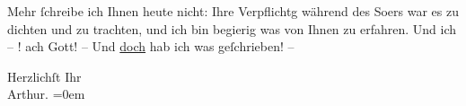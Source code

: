 \pstart
           Mehr{ }ſchreibe ich Ihnen heute nicht: Ihre Verpflichtg während des So{\geminationm}ers war es zu dichten und zu trachten, und ich bin
               begierig was von Ihnen zu erfahren. Und ich – ! ach Gott! – Und \uline{doch} hab ich was geſchrieben! –\pend
           
\pstart
           Herzlichſt Ihr{\\[\baselineskip]}\spacefill\mbox{Arthur.}\pend
           \leftskip=0em{}\endnumbering{}  \newcommand{\dateiname}{L00113}\newcommand{\titel}{Arthur Schnitzler an Richard Beer-Hofmann, 11. 8. 1892}\newcommand{\editorInnen}{Martin Anton Müller und Gerd-Hermann Susen}
